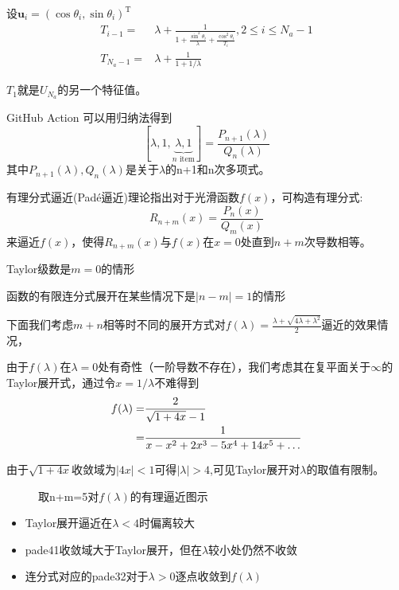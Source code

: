 \documentclass[notheorems,xetex]{beamer}
\theoremstyle{definition}
\begin{document}
\begin{frame}[noframenumbering]
设$\bm{u}_i=(\cos\theta_i,\sin\theta_i)^{\textrm{T}}$
\begin{equation*}
\begin{split}
T_{i-1} =& \lambda + \frac{1}{1+\frac{\sin^2\theta_i}{\lambda}+\frac{\cos^2\theta_i}{T_i}},2\leq i\leq N_a-1\\
T_{N_a-1}  =& \lambda+\frac{1}{1+1/\lambda}
\end{split}
\end{equation*}

$T_1$就是$U_{N_a}$的另一个特征值。
\end{frame}
\begin{frame}[noframenumbering]{GitHub Action}
可以用归纳法得到
\[
[\lambda,1,\underbrace{\lambda,1}_{\text{$n$ item}}]=\frac{P_{n+1}(\lambda)}{Q_n(\lambda)}
\]
其中$P_{n+1}(\lambda),Q_n(\lambda)$是关于$\lambda$的n+1和n次多项式。
\end{frame}
\begin{frame}[noframenumbering]
有理分式逼近(Pad\'{e}逼近)理论指出对于光滑函数$f(x)$，可构造有理分式:
\[
R_{n+m}(x)=\frac{P_n(x)}{Q_m(x)}
\]
来逼近$f(x)$，使得$R_{n+m}(x)$与$f(x)$在$x=0$处直到$n+m$次导数相等。
\pause


Taylor级数是$m=0$的情形
\pause

函数的有限连分式展开在某些情况下是$|n-m|=1$的情形
\begin{flushright}
\end{flushright}
\end{frame}
\begin{frame}[noframenumbering]
下面我们考虑$m+n$相等时不同的展开方式对$f(\lambda)=\frac{\lambda+\sqrt{4\lambda+\lambda^2}}{2}$逼近的效果情况，
\pause

由于$f(\lambda)$在$\lambda=0$处有奇性（一阶导数不存在），我们考虑其在复平面关于$\infty$的Taylor展开式，通过令$x=1/\lambda$不难得到
\begin{align}\notag
f(\lambda)=&\frac{2}{\sqrt{1+4x}-1}\\
=&\frac{1}{x-x^2+2x^3-5x^4+14x^5+\dots}
\end{align}

由于$\sqrt{1+4x}$收敛域为$|4x|<1$可得$|\lambda|>4$,可见Taylor展开对$\lambda$的取值有限制。
\end{frame}
\begin{frame}[noframenumbering]
\begin{figure}
\centering
\caption*{取n+m=5对$f(\lambda)$的有理逼近图示}
\end{figure}
\begin{itemize}
  \item Taylor展开逼近在$\lambda<4$时偏离较大
  \item pade41收敛域大于Taylor展开，但在$\lambda$较小处仍然不收敛
  \item 连分式对应的pade32对于$\lambda>0$逐点收敛到$f(\lambda)$
\end{itemize}
\end{frame}
\end{document}
